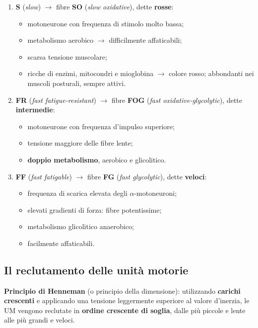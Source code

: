 \begin{enumerate}
  \item \textbf{S} (\textit{slow}) $\rightarrow$ fibre \textbf{SO} (\textit{slow oxidative}),
    dette \textbf{rosse}:
    \begin{itemize}
      \item motoneurone con frequenza di stimolo molto bassa;
      \item metabolismo aerobico $\rightarrow$ difficilmente affaticabili;
      \item scarsa tensione muscolare;
      \item ricche di enzimi, mitocondri e mioglobina $\rightarrow$ colore rosso; abbondanti nei
        muscoli posturali, sempre attivi.
    \end{itemize}
  \item \textbf{FR} (\textit{fast fatigue-resistant}) $\rightarrow$ fibre \textbf{FOG}
    (\textit{fast oxidative-glycolytic}), dette \textbf{intermedie}:
    \begin{itemize}
      \item motoneurone con frequenza d'impulso superiore;
      \item tensione maggiore delle fibre lente;
      \item \textbf{doppio metabolismo}, aerobico e glicolitico.
    \end{itemize}
  \item \textbf{FF} (\textit{fast fatigable}) $\rightarrow$ fibre \textbf{FG} (\textit{fast
    glycolytic}), dette \textbf{veloci}:
    \begin{itemize}
      \item frequenza di scarica elevata degli $\alpha$-motoneuroni;
      \item elevati gradienti di forza: fibre potentissime;
      \item metabolismo glicolitico anaerobico;
      \item facilmente affaticabili.
    \end{itemize}
\end{enumerate}

\subsection{Il reclutamento delle unità motorie}

\textbf{Principio di Henneman} (o principio della dimensione): utilizzando \textbf{carichi
crescenti} e applicando una tensione leggermente superiore al valore d'inerzia, le UM vengono
reclutate in \textbf{ordine crescente di soglia}, dalle più piccole e lente alle più grandi e
veloci.

